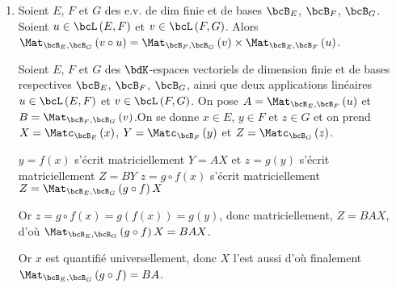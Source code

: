 \documentclass[a4paper,french,bookmarks]{article}
\begin{document}
\questionsdecours

\begin{enumerate}
    \item Soient $E$, $F$ et $G$ des e.v. de dim finie et de bases $\bcB_E$, $\bcB_F$, $\bcB_G$. Soient $u \in \bcL\left(E, F\right)$ et $v \in \bcL\left(F, G\right)$. Alors $\Mat_{\bcB_E, \bcB_G}\left(v \circ u\right) = \Mat_{\bcB_F, \bcB_G}\left(v\right) \times \Mat_{\bcB_E, \bcB_F}\left(u\right)$.
    
    \noafter
    \nobefore\yesafter
    \begin{nproof}
        Soient $E$, $F$ et $G$ des $\bdK$-espaces vectoriels de dimension finie et de bases respectives $\bcB_E$, $\bcB_F$, $\bcB_G$, ainsi que deux applications linéaires $u \in \bcL\left(E, F\right)$ et $v \in \bcL\left(F, G\right)$. On pose $A = \Mat_{\bcB_E, \bcB_F}\left(u\right)$ et $B = \Mat_{\bcB_F, \bcB_G}\left(v\right)$.On se donne $x \in E$, $y \in F$ et $z \in G$ et on prend $X = \Matc_{\bcB_E}\left(x\right)$, $Y = \Matc_{\bcB_F}\left(y\right)$ et $Z = \Matc_{\bcB_G}\left(z\right)$.
        \begin{enumerate}
            \itt $y = f\left(x\right)$ s'écrit matriciellement $Y = AX$ et $z = g\left(y\right)$ s'écrit matriciellement $Z = BY$
            \itt $z = g \circ f\left(x\right)$ s'écrit matriciellement $Z = \Mat_{\bcB_E, \bcB_G}\left(g \circ f\right)X$
        \end{enumerate}
        Or $z = g \circ f \left(x\right) = g\left(f\left(x\right)\right) = g\left(y\right)$, donc matriciellement, $Z = BAX$, d'où $\Mat_{\bcB_E, \bcB_G}\left(g \circ f\right)X = BAX$. 
        
        Or $x$ est quantifié universellement, donc $X$ l'est aussi d'où finalement $\Mat_{\bcB_E, \bcB_G}\left(g \circ f\right) = BA$.
    \end{nproof}
    \yesbefore
    

\end{enumerate}
\end{document}
